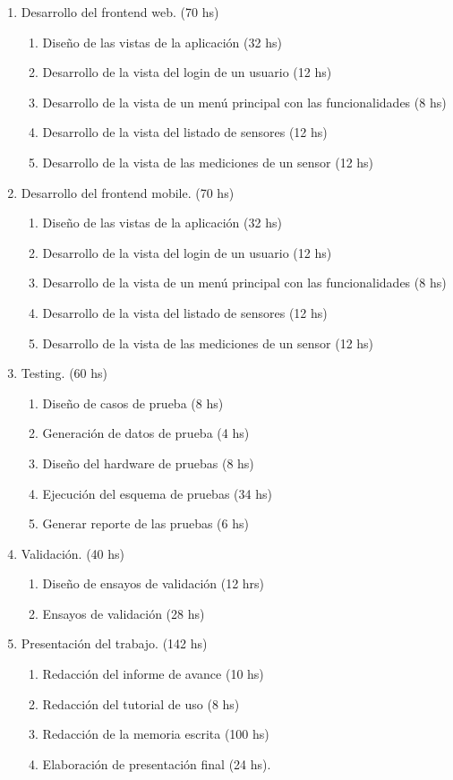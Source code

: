 \documentclass[
11pt, %
]{charter}
\begin{document}
\begin{enumerate}
\begin{enumerate}
	\end{enumerate}
\item Desarrollo del frontend web. (70 hs)
	\begin{enumerate}
	\item Diseño de las vistas de la aplicación (32 hs)
	\item Desarrollo de la vista del login de un usuario (12 hs)
	\item Desarrollo de la vista de un menú principal con las funcionalidades (8 hs)
	\item Desarrollo de la vista del listado de sensores (12 hs)
	\item Desarrollo de la vista de las mediciones de un sensor (12 hs)
	\end{enumerate}
\item Desarrollo del frontend mobile. (70 hs)
	\begin{enumerate}
	\item Diseño de las vistas de la aplicación (32 hs)
	\item Desarrollo de la vista del login de un usuario (12 hs)
	\item Desarrollo de la vista de un menú principal con las funcionalidades (8 hs)
	\item Desarrollo de la vista del listado de sensores (12 hs)
	\item Desarrollo de la vista de las mediciones de un sensor (12 hs)
	\end{enumerate}
\item Testing. (60 hs)
	\begin{enumerate}
	\item Diseño de casos de prueba (8 hs)
	\item Generación de datos de prueba (4 hs)
	\item Diseño del hardware de pruebas (8 hs)
	\item Ejecución del esquema de pruebas (34 hs)
	\item Generar reporte de las pruebas (6 hs)
	\end{enumerate}
\item Validación. (40 hs)
	\begin{enumerate}
	\item Diseño de ensayos de validación (12 hrs)
	\item Ensayos de validación (28 hs)
	\end{enumerate}
\item Presentación del trabajo. (142 hs)
	\begin{enumerate}
	\item Redacción del informe de avance (10 hs)
	\item Redacción del tutorial de uso (8 hs)
	\item Redacción de la memoria escrita (100 hs)
	\item Elaboración de presentación final (24 hs).
	\end{enumerate}	
\end{enumerate}
\end{document}
